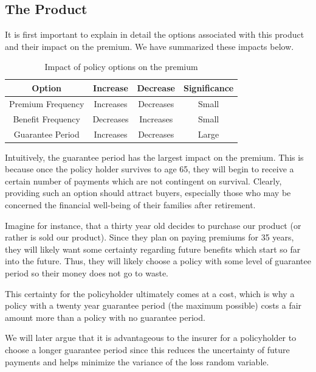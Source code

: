 \documentclass[12pt]{article}
\begin{document}
\subsection{The Product}

It is first important to explain in detail the options associated with this product and their impact on the premium. We have summarized these impacts below.

\begin{table}[!ht] 
\centering 
\begin{tabular}{c c c c}
\hline
Option & Increase & Decrease & Significance \\ \hline  
Premium Frequency & Increases & Decreases & Small \\
Benefit Frequency & Decreases & Increases & Small \\
Guarantee Period & Increases & Decreases & Large\\
\hline  
\end{tabular} 
\caption{Impact of policy options on the premium}  
\label{table:impactpremium} 
\end{table} 

Intuitively, the guarantee period has the largest impact on the premium. This is because once the policy holder survives to age 65, they will begin to receive a certain number of payments which are not contingent on survival. Clearly, providing such an option should attract buyers, especially those who may be concerned the financial well-being of their families after retirement. 

Imagine for instance, that a thirty year old decides to purchase our product (or rather is sold our product). Since they plan on paying premiums for 35 years, they will likely want some certainty regarding future benefits which start so far into the future. Thus, they will likely choose a policy with some level of guarantee period so their money does not go to waste.

This certainty for the policyholder ultimately comes at a cost, which is why a policy with a twenty year guarantee period (the maximum possible) costs a fair amount more than a policy with no guarantee period. %

We will later argue that it is advantageous to the insurer for a policyholder to choose a longer guarantee period since this reduces the uncertainty of future payments and helps minimize the variance of the loss random variable.
\end{document}
